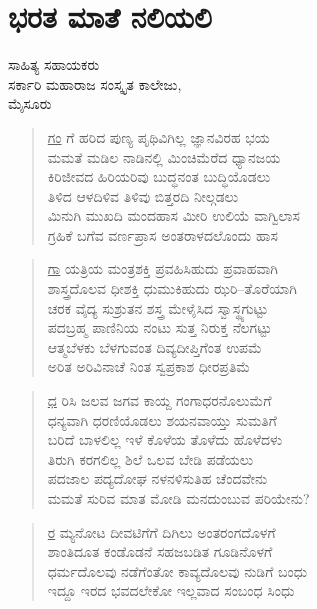 {\fontsize{14}{16}\selectfont
\chapter{ಭರತ ಮಾತೆ ನಲಿಯಲಿ}

\begin{center}
\smallskip
ಸಾಹಿತ್ಯ ಸಹಾಯಕರು\\
ಸರ್ಕಾರಿ ಮಹಾರಾಜ ಸಂಸ್ಕೃತ ಕಾಲೇಜು,\\
ಮೈಸೂರು
\addrule
\end{center}
\begin{verse}
\underline{ಗಂ} ಗೆ 	ಹರಿದ 	ಪುಣ್ಯ ಪೃಥಿವಿಗಿಲ್ಲ 	ಜ್ಞಾನವಿರಹ 	ಭಯ\\
ಮಮತೆ ಮಡಿಲ ನಾಡಿನಲ್ಲಿ ಮಿಂಚಿಮೆರೆದ ಧ್ಯಾನಜಯ\\
ಕಿರಿಜೀವದ ಹಿರಿಯರಿವು ಬುದ್ಧನಂತ ಬುದ್ಧಿಯೊಡಲು\\
ತಿಳಿದ ಆಳದಿಳಿವ ತಿಳಿವು ಬಿತ್ತರದಿ ನೀಲ್ಗಡಲು\\
ಮಿನುಗಿ ಮುಖದಿ ಮಂದಹಾಸ ಮೀರಿ ಉಲಿಯೆ ವಾಗ್ವಿಲಾಸ\\
ಗ್ರಹಿಕೆ ಬಗೆವ ವರ್ಣಪ್ರಾಸ ಅಂತರಾಳದಲೊಂದು ಹಾಸ
\end{verse}
\begin{verse}
\underline{ಗಾ} ಯತ್ರಿಯ ಮಂತ್ರಶಕ್ತಿ ಪ್ರವಹಿಸಿಹುದು ಪ್ರವಾಹವಾಗಿ\\
ಶಾಸ್ತ್ರದೊಲವ ಧೀಶಕ್ತಿ ಧುಮುಕಿಹುದು ಝರಿ–ತೊರೆಯಾಗಿ\\
ಚರಕ ವೈದ್ಯ ಸುಶ್ರುತನ ಶಸ್ತ್ರ ಮೇಳೈಸಿದ ಸ್ವಾಸ್ಥ್ಯಗುಟ್ಟು\\
ಪದಬ್ರಹ್ಮ ಪಾಣಿನಿಯ ನಂಟು ಸುತ್ತ ನಿರುಕ್ತ ನೆಲಗಟ್ಟು\\
ಆತ್ಮಬೆಳಕು ಬೆಳಗುವಂತ ದಿವ್ಯದೀಪ್ತಿಗೆಂತ ಉಪಮೆ\\
ಅರಿತ ಅರಿವಿನಾಚೆ ನಿಂತ ಸ್ವಪ್ರಕಾಶ ಧೀರಪ್ರತಿಮೆ
\end{verse}
\begin{verse}
\underline{ಧ} ರಿಸಿ ಜಲವ ಜಗವ ಕಾಯ್ದ ಗಂಗಾಧರನೊಲುಮೆಗೆ\\
ಧನ್ಯವಾಗಿ ಧರಣಿಯೊಡಲು ಶಯನವಾಯ್ತು ಸುಮತಿಗೆ\\
ಬರಿದೆ ಬಾಳಲಿಲ್ಲ ಇಳೆ ಕೊಳೆಯ ತೊಳೆದು ಹೊಳೆದಳು\\
ತಿರುಗಿ ಕರಗಲಿಲ್ಲ ಶಿಲೆ ಒಲವ ಬೇಡಿ ಪಡೆಯಲು\\
ಪದಜಾಲ ಪದ್ಯದೋಘ ನಳನಳಿಸುತಿಹ ಚೆಂದವೇನು\\
ಮಮತೆ ಸುರಿವ ಮಾತ ಮೋಡಿ ಮನದುಂಬುವ ಪರಿಯೇನು?
\end{verse}
\begin{verse}
\underline{ರ} ಮ್ಯನೋಟ ದೀವಟಿಗೆಗೆ ದಿಗಿಲು ಅಂತರಂಗದೊಳಗೆ\\
ಶಾಂತಿದೂತ ಕಂಡೊಡನೆ ಸಹಜಬಡಿತ ಗೂಡಿನೊಳಗೆ\\
ಧರ್ಮದೊಲವು ನಡೆಗೆಂತೋ ಕಾವ್ಯದೊಲವು ನುಡಿಗೆ ಬಂಧು\\
ಇದ್ದೂ ಇರದ ಭವದಲೇಕೋ ಇಲ್ಲವಾದ ಸಂಬಂಧ ಸಿಂಧು\\

\end{verse}}
